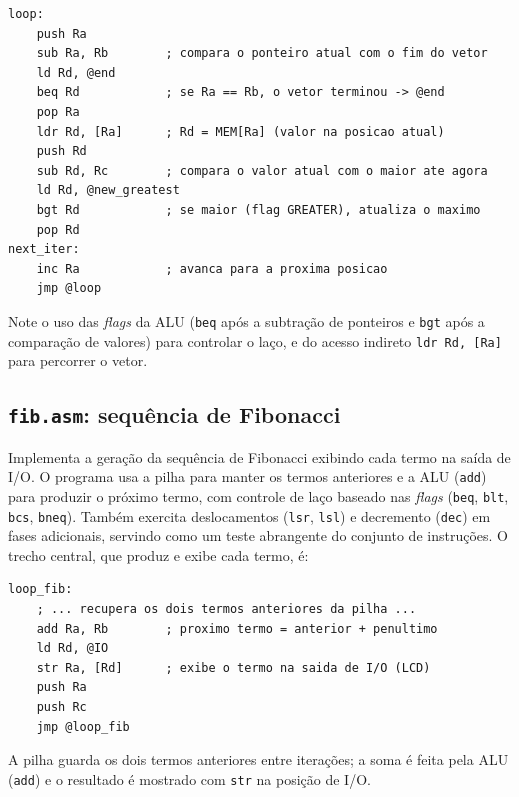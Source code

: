 \documentclass[12pt,a4paper]{article}
\begin{document}
\noindent\begin{minipage}{\linewidth}
\begin{lstlisting}[style=asm]
loop:
    push Ra
    sub Ra, Rb        ; compara o ponteiro atual com o fim do vetor
    ld Rd, @end
    beq Rd            ; se Ra == Rb, o vetor terminou -> @end
    pop Ra
    ldr Rd, [Ra]      ; Rd = MEM[Ra] (valor na posicao atual)
    push Rd
    sub Rd, Rc        ; compara o valor atual com o maior ate agora
    ld Rd, @new_greatest
    bgt Rd            ; se maior (flag GREATER), atualiza o maximo
    pop Rd
next_iter:
    inc Ra            ; avanca para a proxima posicao
    jmp @loop
\end{lstlisting}
\end{minipage}

Note o uso das \textit{flags} da ALU (\texttt{beq} após a subtração de ponteiros e
\texttt{bgt} após a comparação de valores) para controlar o laço, e do acesso indireto
\texttt{ldr Rd, [Ra]} para percorrer o vetor.

\subsection{\texttt{fib.asm}: sequência de Fibonacci}

Implementa a geração da sequência de Fibonacci exibindo cada termo na saída de I/O. O
programa usa a pilha para manter os termos anteriores e a ALU (\texttt{add}) para produzir
o próximo termo, com controle de laço baseado nas \textit{flags} (\texttt{beq},
\texttt{blt}, \texttt{bcs}, \texttt{bneq}). Também exercita deslocamentos (\texttt{lsr},
\texttt{lsl}) e decremento (\texttt{dec}) em fases adicionais, servindo como um teste
abrangente do conjunto de instruções. O trecho central, que produz e exibe cada termo, é:

\noindent\begin{minipage}{\linewidth}
\begin{lstlisting}[style=asm]
loop_fib:
    ; ... recupera os dois termos anteriores da pilha ...
    add Ra, Rb        ; proximo termo = anterior + penultimo
    ld Rd, @IO
    str Ra, [Rd]      ; exibe o termo na saida de I/O (LCD)
    push Ra
    push Rc
    jmp @loop_fib
\end{lstlisting}
\end{minipage}

A pilha guarda os dois termos anteriores entre iterações; a soma é feita pela ALU
(\texttt{add}) e o resultado é mostrado com \texttt{str} na posição de I/O.
\end{document}
